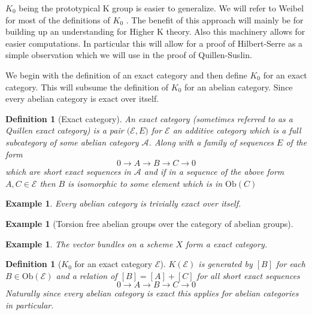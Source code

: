 \documentclass[12pt]{article}
\numberwithin{equation}{section}
\newcounter{dummy} \numberwithin{dummy}{section}
\newtheorem{definition}[dummy]{Definition}
\newtheorem{example}[dummy]{Example}
\begin{document}
%			
	$K_0$ being the prototypical K group is easier to generalize. We will refer to Weibel for most of the definitions of $K_0$ \cite{weibel2013k}. The benefit of this approach will mainly be for building up an understanding for Higher K theory. Also this machinery allows for easier computations. In particular this will allow for a proof of Hilbert-Serre as a simple observation which we will use in the proof of Quillen-Suslin.
	
	We begin with the definition of an exact category and then define $K_0$ for an exact category. This will subsume the definition of $K_0$ for an abelian category. Since every abelian category is exact over itself.
	
	\begin{definition}[Exact category]
		An exact category (sometimes referred to as a Quillen exact category) is a pair $\mathcal{(E},E)$ for $\mathcal{E}$ an additive category which is a full subcategory of some abelian category $\mathcal{A}$. Along with a family of sequences $E$ of the form \[ 0 \to A \to B \to C \to 0 \] which are short exact sequences in $\mathcal{A}$ and if in a sequence of the above form $A, C \in \mathcal{E}$ then $B $ is isomorphic to some element which is in $\mathrm{Ob}(C)$
	\end{definition}
	\begin{example}
		Every abelian category is trivially exact over itself.
	\end{example}
	\begin{example}[Torsion free abelian groups over the category of abelian groups]
	\end{example}
	\begin{example}
		The vector bundles on a scheme $X$ form a exact category.
	\end{example}
	
	\begin{definition}[$K_0$ for an exact category $\mathcal{E}$]
		$K(\mathcal E)$ is generated by $[B]$ for each $B \in \mathrm{Ob}(\mathcal{E})$ and a relation of $[B]=[A]+[C]$ for all short exact sequences \[ 0 \to A \to B \to C \to 0 \]
		Naturally since every abelian category is exact this applies for abelian categories in particular.
	\end{definition}
	
	
\end{document}
